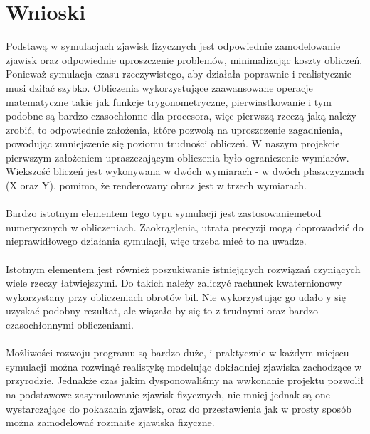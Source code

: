 \section{Wnioski}

Podstawą w symulacjach zjawisk fizycznych jest odpowiednie zamodelowanie zjawisk oraz odpowiednie uproszczenie problemów, minimalizując koszty obliczeń. Ponieważ symulacja czasu rzeczywistego, aby działała poprawnie i realistycznie musi dziłać szybko. Obliczenia wykorzystujące zaawansowane operacje matematyczne takie jak funkcje trygonometryczne, pierwiastkowanie i tym podobne są bardzo czasochłonne dla procesora, więc pierwszą rzeczą jaką należy zrobić, to odpowiednie założenia, które pozwolą na uproszczenie zagadnienia, powodując zmniejszenie się poziomu trudności obliczeń. W naszym projekcie pierwszym założeniem upraszczającym obliczenia było ograniczenie wymiarów. Wiekszość bliczeń jest wykonywana w dwóch wymiarach - w dwóch płaszczyznach (X oraz Y), pomimo, że renderowany obraz jest w trzech wymiarach. \\ \\

Bardzo istotnym elementem tego typu symulacji jest zastosowaniemetod numerycznych w obliczeniach. Zaokrąglenia, utrata precyzji mogą doprowadzić do nieprawidłowego działania symulacji, więc trzeba mieć to na uwadze. \\ \\

Istotnym elementem jest również poszukiwanie istniejących rozwiązań czyniących wiele rzeczy łatwiejszymi. Do takich należy zaliczyć rachunek kwaternionowy wykorzystany przy obliczeniach obrotów bil. Nie wykorzystując go udało y się uzyskać podobny rezultat, ale wiązało by się to z trudnymi oraz bardzo czasochłonnymi obliczeniami. \\ \\

Możliwości rozwoju programu są bardzo duże, i praktycznie w każdym miejscu symulacji można rozwinąć realistykę modelując dokładniej zjawiska zachodzące w przyrodzie. Jednakże czas jakim dysponowaliśmy na wwkonanie projektu pozwolił na podstawowe zasymulowanie zjawisk fizycznych, nie mniej jednak są one wystarczające do pokazania zjawisk, oraz do przestawienia jak w prosty sposób można zamodelować rozmaite zjawiska fizyczne.